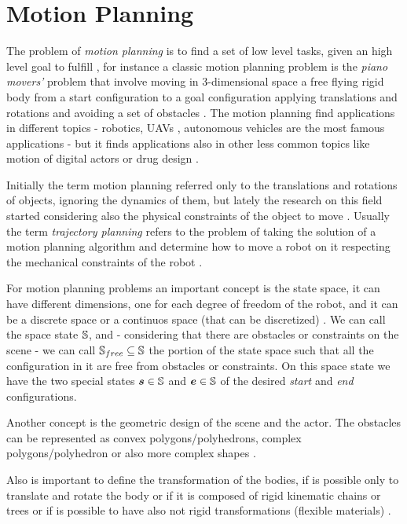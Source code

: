 \documentclass[dissertation.tex]{subfiles}
\begin{document}
\chapter{Motion Planning}
The problem of \emph{motion planning} is to find a set of
low level tasks, given an high level goal to fulfill
\cite{choset}, for instance a classic motion planning problem is the
\emph{piano movers'} problem that involve moving in 3-dimensional space
a free flying rigid 
body from a start configuration to a goal configuration applying
translations and rotations and avoiding a set
of obstacles \cite{choset}\cite{lavalle}. The motion planning find
applications in 
different topics - robotics, \acp{UAV} \cite{goerzen}, autonomous
vehicles \cite{paden} are the most
famous applications - but it finds applications also in other less
common topics like motion of digital actors or drug design
\cite{choset}.

Initially the term motion planning referred only to the translations
and rotations of objects, ignoring the dynamics of them, but lately
the research on this field started considering also the physical
constraints of the object to move \cite{lavalle}. Usually the term
\emph{trajectory planning} refers to the problem of taking the
solution of a
motion planning algorithm and determine how to move a robot on it
respecting the mechanical constraints of the robot \cite{lavalle}.

For motion planning problems an important concept is the state space,
it can have different dimensions, one for each degree of freedom of
the robot, and it can be a discrete space or a continuos space (that
can be discretized) \cite{lavalle}. We can call the space state $\mathbb{S}$,
and - considering that there are obstacles or constraints on the scene
- we can call $\mathbb{S}_{free}\subseteq\mathbb{S}$
the portion of the state space such that all the configuration in it
are free from obstacles or constraints. On this space state we have
the two special states $\boldsymbol{s}\in\mathbb{S}$ and $\boldsymbol{e}\in\mathbb{S}$ of the
desired \emph{start} and \emph{end} configurations.

Another concept is the geometric design of the scene and the
actor. The obstacles can be represented as convex
polygons/polyhedrons, complex polygons/polyhedron or also more complex
shapes \cite{lavalle}.

Also is important to define the transformation of the bodies, if is
possible only to translate and rotate the body or if it is composed of
rigid kinematic chains or trees or if is possible to have also not
rigid transformations (flexible materials) \cite{lavalle}.
\end{document}
